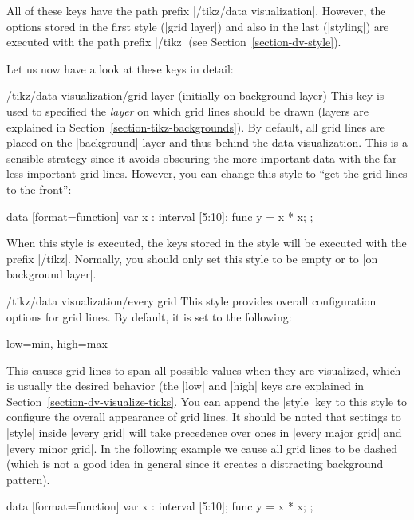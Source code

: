 All of these keys have the path prefix |/tikz/data visualization|. However, the options stored in the first style (|grid layer|) and also in the last (|styling|) are executed with the path prefix |/tikz| (see Section~\ref{section-dv-style}).

Let us now have a look at these keys in detail:

\begin{stylekey}{/tikz/data visualization/grid layer (initially on background layer)}
\label{section-dv-grid-layer}%
    This key is used to specified the \emph{layer} on which grid lines should be drawn (layers are explained in Section~\ref{section-tikz-backgrounds}). By default, all grid lines are placed on the |background| layer and thus behind the data visualization. This is a sensible strategy since it avoids obscuring the more important data with the far less important grid lines. However, you can change this style to ``get the grid lines to the front'':
\begin{codeexample}[preamble={\usetikzlibrary{datavisualization.formats.functions}}]
\tikz \datavisualization
  [scientific axes,
   all axes={
     length=3cm,
     grid,
     grid={minor steps between steps}
   },
   grid layer/.style=, %
   visualize as line]
  data [format=function] {
    var x : interval [5:10];
    func y = \value x * \value x;
  };
\end{codeexample}
    When this style is executed, the keys stored in the style will be executed with the prefix |/tikz|. Normally, you should only set this style to be empty or to |on background layer|.
\end{stylekey}

\begin{stylekey}{/tikz/data visualization/every grid}
    This style provides overall configuration options for grid lines. By default, it is set to the following:
\begin{codeexample}
low=min, high=max
\end{codeexample}
    This causes grid lines to span all possible values when they are visualized, which is usually the desired behavior (the |low| and |high| keys are explained in Section~\ref{section-dv-visualize-ticks}. You can append the |style| key to this style to configure the overall appearance of grid lines. It should be noted that settings to |style| inside |every grid| will take precedence over ones in |every major grid| and |every minor grid|. In the following example we cause all grid lines to be dashed (which is not a good idea in general since it creates a distracting background pattern).
\begin{codeexample}[preamble={\usetikzlibrary{datavisualization.formats.functions}}]
\tikz \datavisualization
  [scientific axes,
   all axes={length=3cm, grid},
   every grid/.append style={style=densely dashed},
   visualize as line]
  data [format=function] {
    var x : interval [5:10];
    func y = \value x * \value x;
  };
\end{codeexample}
\end{stylekey}

